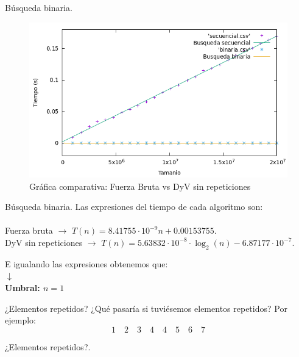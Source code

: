 \documentclass[10pt, xcolor=table]{beamer}
\begin{document}
\begin{frame}[fragile]{Búsqueda binaria. }
	\begin{figure}[h!]
		\centering
		\includegraphics[scale=0.45]{./Images/Grafica_secvsbin.png}
		\caption{Gráfica comparativa: Fuerza Bruta vs DyV sin repeticiones}
	\end{figure}
\end{frame}

\begin{frame}[fragile]{Búsqueda binaria. }
Las expresiones del tiempo de cada algoritmo son:\\
\\
\centering Fuerza bruta $\longrightarrow$ \( T(n) = 8.41755 \cdot 10^{-9} n + 0.00153755\).\\
\centering DyV sin repeticiones $\longrightarrow$ \( T(n) = 5.63832 \cdot 10^{-8} \cdot \log_{2}(n) - 6.87177 \cdot 10^{-7}\).

E igualando las expresiones obtenemos que: \\
\centering $\downarrow$ \\
\centering \textbf{Umbral: $n = 1$}

\end{frame}

\begin{frame}[fragile]{¿Elementos repetidos?}
¿Qué pasaría si tuviésemos elementos repetidos? Por ejemplo:
\[
	1 \quad 2 \quad 3 \quad 4 \quad 4 \quad 5 \quad 6 \quad 7
\]
\end{frame}

\begin{frame}[fragile]{¿Elementos repetidos?. }

\end{frame}
\end{document}
